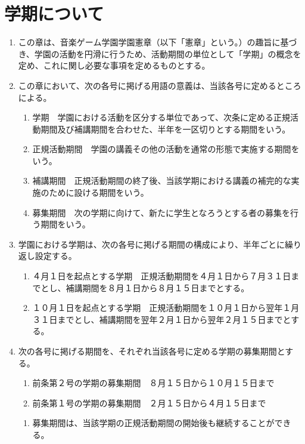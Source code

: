 \newpage
\chapter{学期について}
\begin{enumerate}[label=第\arabic*条　]
  \item この章は、音楽ゲーム学園学園憲章（以下「憲章」という。）の趣旨に基づき、学園の活動を円滑に行うため、活動期間の単位として「学期」の概念を定め、これに関し必要な事項を定めるものとする。
  \item この章において、次の各号に掲げる用語の意義は、当該各号に定めるところによる。
      \begin{enumerate}[label=(\arabic*)　]
        \item 学期　学園における活動を区分する単位であって、次条に定める正規活動期間及び補講期間を合わせた、半年を一区切りとする期間をいう。
        \item 正規活動期間　学園の講義その他の活動を通常の形態で実施する期間をいう。
        \item 補講期間　正規活動期間の終了後、当該学期における講義の補完的な実施のために設ける期間をいう。
        \item 募集期間　次の学期に向けて、新たに学生となろうとする者の募集を行う期間をいう。
      \end{enumerate}
  \item 学園における学期は、次の各号に掲げる期間の構成により、半年ごとに繰り返し設定する。
      \begin{enumerate}[label=(\arabic*)　]
        \item ４月１日を起点とする学期　正規活動期間を４月１日から７月３１日までとし、補講期間を８月１日から８月１５日までとする。
        \item １０月１日を起点とする学期　正規活動期間を１０月１日から翌年１月３１日までとし、補講期間を翌年２月１日から翌年２月１５日までとする。
      \end{enumerate}
  \item 次の各号に掲げる期間を、それぞれ当該各号に定める学期の募集期間とする。
      \begin{enumerate}[label=(\arabic*)　]
        \item 前条第２号の学期の募集期間　８月１５日から１０月１５日まで
        \item 前条第１号の学期の募集期間　２月１５日から４月１５日まで
      \end{enumerate}
    \begin{enumerate}[label=\arabic*　,start=2,leftmargin=*]
      \item 募集期間は、当該学期の正規活動期間の開始後も継続することができる。

\end{enumerate}
\end{enumerate}
